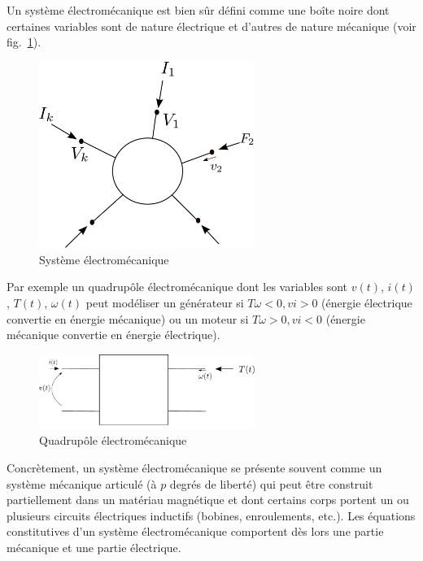 Un système électromécanique est bien sûr défini comme une boîte noire dont certaines variables sont de nature électrique et d'autres de nature mécanique (voir fig.~\ref{fig:systemelectromec}).


\begin{figure}[t]
\begin{center}
\includegraphics[width=7cm]{systemelectromec}
\caption{Système électromécanique}
\label{fig:systemelectromec}
\end{center}
\end{figure}

Par exemple un quadrupôle électromécanique dont les variables sont $v(t)$, $i(t)$, $T(t)$,  $\omega(t)$ peut modéliser un générateur si $T\omega<0, vi>0$ (énergie électrique convertie en énergie mécanique) ou un moteur si $T\omega>0, vi<0$ (énergie mécanique convertie en énergie électrique).


\begin{figure}[t]
\begin{center}
\includegraphics[width=7cm]{quadrupelectromec}
\caption{Quadrupôle électromécanique}
\label{fig:quadrupelectromec}
\end{center}
\end{figure}


Concrètement, un système électromécanique se présente souvent comme un système
mécanique articulé (à $p$ degrés de liberté) qui peut être
construit partiellement dans un matériau magnétique et dont
certains corps portent un ou plusieurs circuits électriques inductifs (bobines,
enroulements, etc.). Les équations constitutives d'un système
électromécanique comportent dès lors une partie mécanique et
une partie électrique.

